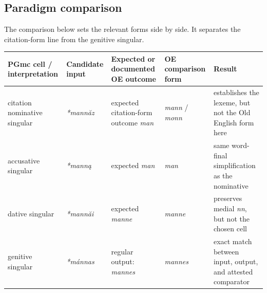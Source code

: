 \documentclass[
  british,
  a4paper,
  openany]{book}
\newcounter{none} %
\begin{document}
\subsection{Paradigm comparison}\label{paradigm-comparison-10}

The comparison below sets the relevant forms side by side. It separates
the citation-form line from the genitive singular.

{\def\LTcaptype{none} %
\begin{longtable}[]{@{}
  >{\raggedright\arraybackslash}p{}
  >{\raggedright\arraybackslash}p{}
  >{\raggedright\arraybackslash}p{}
  >{\raggedright\arraybackslash}p{}
  >{\raggedright\arraybackslash}p{}@{}}
\toprule\noalign{}
\begin{minipage}[b]{\linewidth}\raggedright
PGmc cell / interpretation
\end{minipage} & \begin{minipage}[b]{\linewidth}\raggedright
Candidate input
\end{minipage} & \begin{minipage}[b]{\linewidth}\raggedright
Expected or documented OE outcome
\end{minipage} & \begin{minipage}[b]{\linewidth}\raggedright
OE comparison form
\end{minipage} & \begin{minipage}[b]{\linewidth}\raggedright
Result
\end{minipage} \\
\midrule\noalign{}
\endhead
\bottomrule\noalign{}
\endlastfoot
citation nominative singular & {\emph{*mannăz}} & expected citation-form
outcome {\emph{man}} & {\emph{mann}} / {\emph{monn}} & establishes the
lexeme, but not the Old English form here \\
accusative singular & {\emph{*manną}} & expected {\emph{man}} &
{\emph{man}} & same word-final simplification as the nominative \\
dative singular & {\emph{*mannăi}} & expected {\emph{manne}} &
{\emph{manne}} & preserves medial \emph{nn}, but not the chosen cell \\
genitive singular & {\emph{*mánnas}} & regular output: {\emph{mannes}} &
{\emph{mannes}} & exact match between input, output, and attested
comparator \\
\end{longtable}
}
\end{document}

